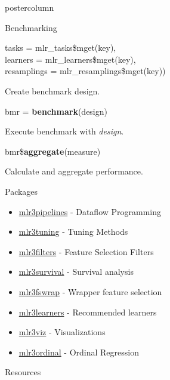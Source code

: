 \documentclass{beamer}
\begin{document}
\begin{frame}[fragile]{}
\begin{columns}
\begin{column}{.31\textwidth}
\begin{beamercolorbox}[center]{postercolumn}
\begin{minipage}{.98\textwidth}
{\begin{myblock}{Benchmarking}
\begin{codeboxmultiline}[width=21.95cm]
							\hspace*{1ex}tasks = mlr\_tasks\$mget(key),\\
							\hspace*{1ex}learners = mlr\_learners\$mget(key),\\
							\hspace*{1ex}resamplings = mlr\_resamplings\$mget(key))
						\end{codeboxmultiline}
						\hspace*{1ex}Create benchmark design.
						\\
						\begin{codebox}
							bmr = \textbf{benchmark}(design)
						\end{codebox}
						\hspace*{1ex}Execute benchmark with \textit{design}.
						\\
						\begin{codebox}
							bmr\$\textbf{aggregate}(measure)
						\end{codebox}
						\hspace*{1ex}Calculate and aggregate performance.
					\end{myblock}
					\begin{myblock}{Packages}
						\begin{itemize}
							\item \href{https://github.com/mlr-org/mlr3pipelines}{mlr3pipelines} - Dataflow Programming
							\item \href{https://github.com/mlr-org/mlr3tuning}{mlr3tuning} - Tuning Methods
							\item \href{https://github.com/mlr-org/mlr3filters}{mlr3filters} - Feature Selection Filters
							\item \href{https://github.com/mlr-org/mlr3survival}{mlr3survival} - Survival analysis
							\item \href{https://github.com/mlr-org/mlr3fswrap}{mlr3fswrap} - Wrapper feature selection
							\item \href{https://github.com/mlr-org/mlr3learners}{mlr3learners} - Recommended learners
							\item \href{https://github.com/mlr-org/mlr3viz}{mlr3viz} - Visualizations
							\item \href{https://github.com/mlr-org/mlr3ordinal}{mlr3ordinal} - Ordinal Regression
						\end{itemize}
					\end{myblock}
					\begin{myblock}{Resources}
						\begin{itemize}

\end{itemize}
\end{myblock}}
\end{minipage}
\end{beamercolorbox}
\end{column}
\end{columns}
\end{frame}
\end{document}
